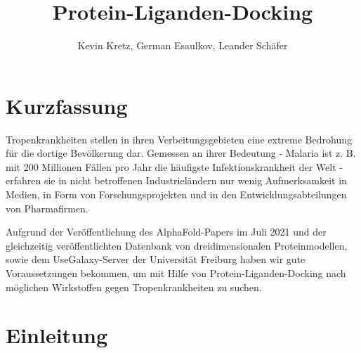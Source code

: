\documentclass[11pt]{article}
\title{Protein-Liganden-Docking}
\author{Kevin Kretz, German Esaulkov, Leander Schäfer}
\begin{document}
    \maketitle

    \tableofcontents


    \section{Kurzfassung}


    Tropenkrankheiten stellen in ihren Verbeitungsgebieten eine extreme Bedrohung für die dortige Bevölkerung dar. Gemessen an ihrer Bedeutung - Malaria ist z. B. mit 200 Millionen Fällen pro Jahr die häufigste Infektionskrankheit der Welt  - erfahren sie in nicht betroffenen Industrieländern nur wenig Aufmerksamkeit in Medien, in Form von Forschungsprojekten und in den Entwicklungsabteilungen von Pharmafirmen.

    Aufgrund der Veröffentlichung des AlphaFold-Papers im Juli 2021 und der gleichzeitig veröffentlichten Datenbank von dreidimensionalen Proteinmodellen, sowie dem UseGalaxy-Server der Universität Freiburg haben wir gute Voraussetzungen bekommen, um mit Hilfe von Protein-Liganden-Docking nach möglichen Wirkstoffen gegen Tropenkrankheiten zu suchen.



    \section{Einleitung}
\end{document}
